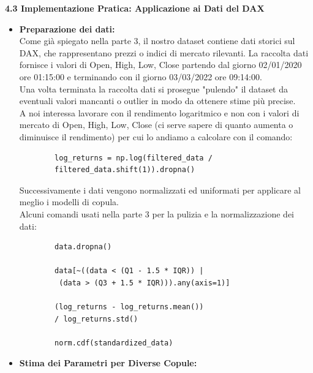 \documentclass[a4paper,12pt]{article}
\begin{document}
\noindent\textbf{4.3 Implementazione Pratica: Applicazione ai Dati del DAX} \\
\begin{itemize}
	\item \textbf{Preparazione dei dati:}\\
	Come già spiegato nella parte 3, il nostro dataset contiene dati storici sul DAX, che rappresentano prezzi o indici di mercato rilevanti. La raccolta dati fornisce i valori di Open, High, Low, Close partendo dal giorno 02/01/2020 ore 01:15:00 e terminando con il giorno 03/03/2022 ore 09:14:00. \\
	Una volta terminata la raccolta dati si prosegue "pulendo" il dataset da eventuali valori mancanti o outlier in modo da ottenere stime più precise.\\
	A noi interessa lavorare con il rendimento logaritmico e non con i valori di mercato di Open, High, Low, Close (ci serve sapere di quanto aumenta o diminuisce il rendimento) per cui lo andiamo a calcolare con il comando:\\
	\begin{verbatim}
		log_returns = np.log(filtered_data / 
		filtered_data.shift(1)).dropna()
	\end{verbatim}
	Successivamente i dati vengono normalizzati ed uniformati per applicare al meglio i modelli di copula.\\
	Alcuni comandi usati nella parte 3 per la pulizia e la normalizzazione dei dati:\\
	\begin{verbatim}
		data.dropna()
		
		data[~((data < (Q1 - 1.5 * IQR)) | 
		 (data > (Q3 + 1.5 * IQR))).any(axis=1)]
		
		(log_returns - log_returns.mean())
		/ log_returns.std()
		
		norm.cdf(standardized_data)
	\end{verbatim}
	\item \textbf{Stima dei Parametri per Diverse Copule:}\\
	
\end{itemize}
\end{document}
